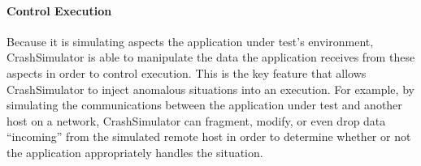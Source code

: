     \paragraph{Control Execution}

    Because it is simulating aspects the application under test's environment, CrashSimulator is able to manipulate the
    data the application receives from these aspects in order to control execution.  This is the key feature that allows
    CrashSimulator to inject anomalous situations into an execution.  For example, by simulating the communications
    between the application under test and another host on a network, CrashSimulator can fragment, modify, or even drop
    data ``incoming'' from the simulated remote host in order to determine whether or not the application appropriately
    handles the situation. 